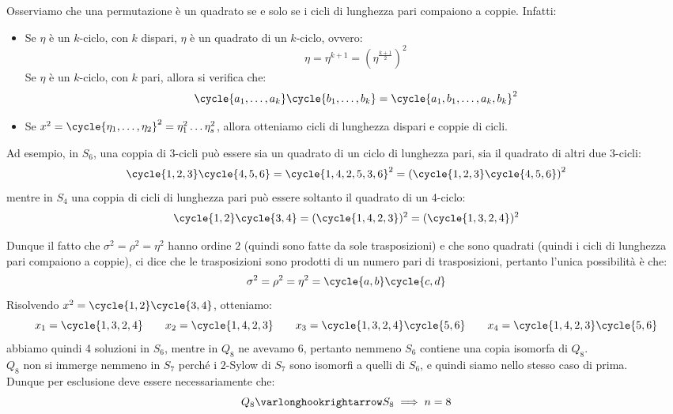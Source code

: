\documentclass[11pt]{scrartcl}
\begin{document}
\begin{soln}
    \begin{remark}
        Osserviamo che una permutazione è un quadrato se e solo se i cicli di lunghezza pari compaiono a coppie. Infatti:
            \begin{itemize}
                \item Se $\eta$ è un $k$-ciclo, con $k$ dispari, $\eta$ è un quadrato di un $k$-ciclo, ovvero:
                        \[ \eta = \eta^{k+1} = \left(\eta^{\frac{k+1}{2}}\right)^2
                            \]
                Se $\eta$ è un $k$-ciclo, con $k$ pari, allora si verifica che:
                        \[ \cycle{a_1,\ldots,a_k}\cycle{b_1,\ldots,b_k} = \cycle{a_1,b_1,\ldots,a_k,b_k}^2
                            \]
                \item Se $x^2 = \cycle{\eta_1, \ldots, \eta_2}^2 = \eta_1^2 \ldots \eta_s^2$, allora otteniamo cicli di lunghezza dispari e coppie di cicli.
            \end{itemize}
        Ad esempio, in $S_6$, una coppia di 3-cicli può essere sia un quadrato di un ciclo di lunghezza pari, sia il quadrato di altri due 3-cicli:
            \[ \cycle{1,2,3}\cycle{4,5,6} = \cycle{1,4,2,5,3,6}^2 = \left(\cycle{1,2,3}\cycle{4,5,6}\right)^2
                \]
        mentre in $S_4$ una coppia di cicli di lunghezza pari può essere soltanto il quadrato di un 4-ciclo:
            \[ \cycle{1,2}\cycle{3,4} = (\cycle{1,4,2,3})^2 = (\cycle{1,3,2,4})^2
                \]
    \end{remark}
    Dunque il fatto che $\sigma^2 = \rho^2 = \eta^2$ hanno ordine $2$ (quindi sono fatte da sole trasposizioni) e che sono quadrati (quindi i cicli di lunghezza pari compaiono a coppie),
    ci dice che le trasposizioni sono prodotti di un numero pari di trasposizioni, pertanto l'unica possibilità è che:
        \[ \sigma^2 = \rho^2 = \eta^2 = \cycle{a,b}\cycle{c,d}
            \]
    Risolvendo $x^2 = \cycle{1,2}\cycle{3,4}$, otteniamo:
        \[ x_1 = \cycle{1,3,2,4} \qquad x_2 = \cycle{1,4,2,3} \qquad x_3 = \cycle{1,3,2,4}\cycle{5,6} \qquad x_4 = \cycle{1,4,2,3}\cycle{5,6}
            \]
    abbiamo quindi 4 soluzioni in $S_6$, mentre in $Q_8$ ne avevamo 6, pertanto nemmeno $S_6$ contiene una copia isomorfa di $Q_8$.\\
    $Q_8$ non si immerge nemmeno in $S_7$ perché i $2$-Sylow di $S_7$ sono isomorfi a quelli di $S_6$, e quindi siamo nello stesso caso di prima. \\
    Dunque per esclusione deve essere necessariamente che:
        \[ Q_8 \varlonghookrightarrow S_8 \implies n = 8
\]
\end{soln}
\end{document}
